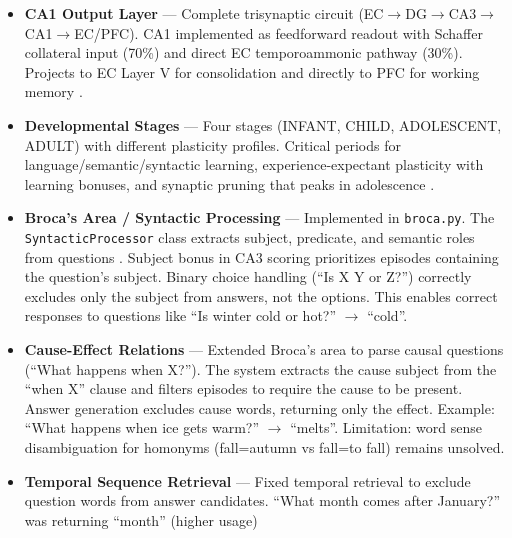 \documentclass[11pt]{article}
\begin{document}
\begin{itemize}
      Implemented in \texttt{basal\_ganglia.py} with D1 (Go) and D2 (NoGo) pathways in Striatum,
      GPi/GPe tonic inhibition, and STN hyperdirect pathway for emergency stopping.
      Neuromodulators (DA/ACh/NE/5-HT) modulate all pathways. Integrated into \texttt{ask()}
      to select between ``retrieve'' and ``multi\_hop'' strategies based on cortical salience
      and neuromodulator state \citep{frank2006making,mink1996basal}.
\item \textbf{CA1 Output Layer} --- Complete trisynaptic circuit
      (EC$\rightarrow$DG$\rightarrow$CA3$\rightarrow$CA1$\rightarrow$EC/PFC).
      CA1 implemented as feedforward readout with Schaffer collateral input (70\%) and
      direct EC temporoammonic pathway (30\%). Projects to EC Layer V for consolidation
      and directly to PFC for working memory \citep{amaral1989three,naber2001reciprocal}.
\item \textbf{Developmental Stages} --- Four stages (INFANT, CHILD, ADOLESCENT, ADULT)
      with different plasticity profiles. Critical periods for language/semantic/syntactic learning,
      experience-expectant plasticity with learning bonuses, and synaptic pruning that peaks
      in adolescence \citep{hensch2005critical,huttenlocher1979synaptic}.
\item \textbf{Broca's Area / Syntactic Processing} --- Implemented in \texttt{broca.py}.
      The \texttt{SyntacticProcessor} class extracts subject, predicate, and semantic roles from
      questions \citep{friederici2011brain}. Subject bonus in CA3 scoring prioritizes episodes
      containing the question's subject. Binary choice handling (``Is X Y or Z?'') correctly
      excludes only the subject from answers, not the options. This enables correct responses
      to questions like ``Is winter cold or hot?'' $\rightarrow$ ``cold''.
\item \textbf{Cause-Effect Relations} --- Extended Broca's area to parse causal questions
      (``What happens when X?''). The system extracts the cause subject from the ``when X'' clause
      and filters episodes to require the cause to be present. Answer generation excludes cause
      words, returning only the effect. Example: ``What happens when ice gets warm?'' $\rightarrow$
      ``melts''. Limitation: word sense disambiguation for homonyms (fall=autumn vs fall=to fall)
      remains unsolved.
\item \textbf{Temporal Sequence Retrieval} --- Fixed temporal retrieval to exclude question words
      from answer candidates. ``What month comes after January?'' was returning ``month'' (higher usage)

\end{itemize}
\end{document}
